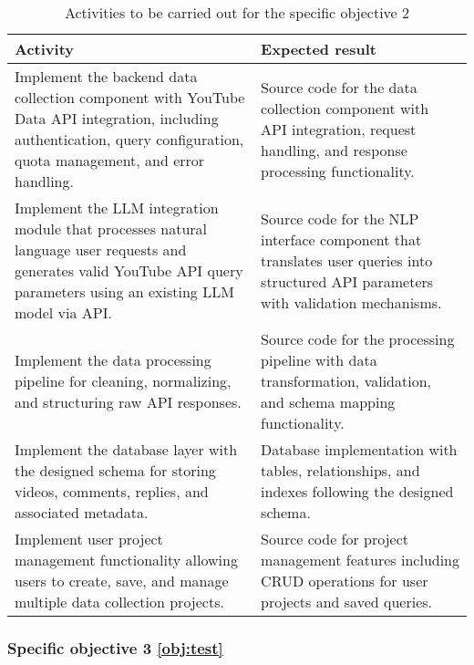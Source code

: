 \begin{table}[htbp]
	\centering
	\small
	\caption{Activities to be carried out for the specific objective 2}
	\label{tab:activities_specific_objective_2}
	\begin{tabularx}{\textwidth}{>{\raggedright\arraybackslash}p{4cm}X}
		\toprule
		\textbf{Activity} & \textbf{Expected result} \\
		\midrule
		Implement the backend data collection component with YouTube Data API integration, including authentication, query configuration, quota management, and error handling. & Source code for the data collection component with API integration, request handling, and response processing functionality. \\
		\midrule
		Implement the LLM integration module that processes natural language user requests and generates valid YouTube API query parameters using an existing LLM model via API. & Source code for the NLP interface component that translates user queries into structured API parameters with validation mechanisms. \\
		\midrule
		Implement the data processing pipeline for cleaning, normalizing, and structuring raw API responses. & Source code for the processing pipeline with data transformation, validation, and schema mapping functionality. \\
		\midrule
		Implement the database layer with the designed schema for storing videos, comments, replies, and associated metadata. & Database implementation with tables, relationships, and indexes following the designed schema. \\
		\midrule
		Implement user project management functionality allowing users to create, save, and manage multiple data collection projects. & Source code for project management features including CRUD operations for user projects and saved queries. \\
		\bottomrule
	\end{tabularx}
\end{table}

\subsubsection{Specific objective 3 \ref{obj:test}}

